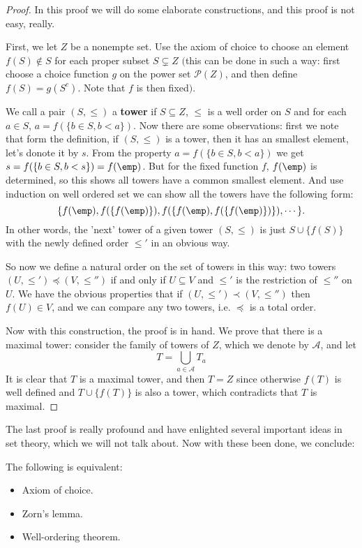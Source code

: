 \begin{proof}
In this proof we will do some elaborate constructions, and this proof is not easy, really.\par
First, we let $Z$ be a nonempte set. Use the axiom of choice to choose an element $f(S)\notin S$ for each proper subset $S\subsetneq Z$ $($this can be done 
in such a way: first choose a choice function $g$ on the power set $\mathscr{P}(Z)$, and then define $f(S)=g(S^{c})$. Note that $f$ is then fixed$)$.\par
We call a pair $(S,\leq)$ a \textbf{tower} if $S\subseteq Z$, $\leq$ is a well order on $S$ and for each $a\in S$, $a=f(\{b\in S, b<a\})$. Now 
there are some observations: first we note that form the definition, if $(S,\leq)$ is a tower, then it has an smallest element, let's donote it by $s$. 
From the property $a=f(\{b\in S, b<a\})$ we get $s=f(\{b\in S, b<s\})=f(\emp)$. But for the fixed function $f$, $f(\emp)$ is determined, so this shows all towers have a common smallest element. And use induction on well ordered set we can show all the towers have the following form:
\[\{f(\emp),f(\{f(\emp)\}),f(\{f(\emp),f(\{f(\emp)\})\}),\cdots\}.\]
In other words, the 'next' tower of a given tower $(S,\leq)$ is just $S\cup\{f(S)\}$ with the newly defined order $\leq'$ in an obvious way.\par
So now we define a natural order on the set of towers in this way: two towers $(U,\leq')\preceq(V,\leq'')$ if and only if $U\subseteq V$ and $\leq'$ is the restriction 
of $\leq''$ on $U$. We have the obvious properties that if $(U,\leq')\prec(V,\leq'')$ then $f(U)\in V$, and we can compare any two towers, i.e. $\preceq$ is a total order.\par
Now with this construction, the proof is in hand. We prove that there is a maximal tower: consider the family of towers of $Z$, which we denote by $\mathscr{A}$, and let 
	\[T=\bigcup_{a\in\mathscr{A}}T_a\]
	It is clear that $T$ is a maximal tower, and then $T=Z$ since otherwise $f(T)$ is well defined and $T\cup\{f(T)\}$ is also a tower, which contradicts that $T$ is maximal.
\end{proof}
The last proof is really profound and have enlighted several important ideas in set theory, which we will not talk about. Now with these been done, we conclude:
\begin{theorem}
The following is equivalent:
\begin{itemize}
\item Axiom of choice.
\item Zorn's lemma.
\item Well-ordering theorem.
\end{itemize}
\end{theorem}
